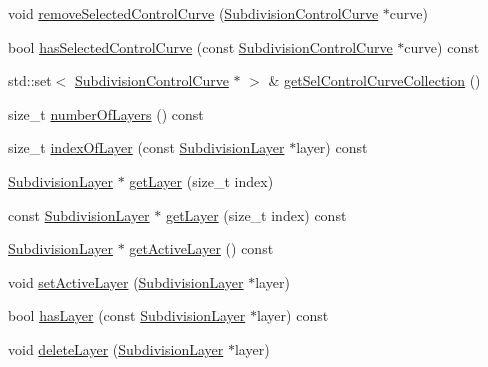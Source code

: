 \begin{DoxyCompactItemize}
\item 
void \hyperlink{classShipCAD_1_1SubdivisionSurface_a1666628c8232ba11d386641fa7980ed7}{remove\+Selected\+Control\+Curve} (\hyperlink{classShipCAD_1_1SubdivisionControlCurve}{Subdivision\+Control\+Curve} $\ast$curve)
\item 
bool \hyperlink{classShipCAD_1_1SubdivisionSurface_a1eebd6470c583678d5994007be6b4a9b}{has\+Selected\+Control\+Curve} (const \hyperlink{classShipCAD_1_1SubdivisionControlCurve}{Subdivision\+Control\+Curve} $\ast$curve) const 
\item 
std\+::set$<$ \hyperlink{classShipCAD_1_1SubdivisionControlCurve}{Subdivision\+Control\+Curve} $\ast$ $>$ \& \hyperlink{classShipCAD_1_1SubdivisionSurface_a8a5a47a51d20fd5ceaf2643e245331a2}{get\+Sel\+Control\+Curve\+Collection} ()
\item 
size\+\_\+t \hyperlink{classShipCAD_1_1SubdivisionSurface_a011480014cfb68430c9f60aff474936c}{number\+Of\+Layers} () const 
\item 
size\+\_\+t \hyperlink{classShipCAD_1_1SubdivisionSurface_a9d2f9e794d6c320f9603daa399e214d5}{index\+Of\+Layer} (const \hyperlink{classShipCAD_1_1SubdivisionLayer}{Subdivision\+Layer} $\ast$layer) const 
\item 
\hyperlink{classShipCAD_1_1SubdivisionLayer}{Subdivision\+Layer} $\ast$ \hyperlink{classShipCAD_1_1SubdivisionSurface_a24b230e51a0c5fb3e7f51d0e2340eb9f}{get\+Layer} (size\+\_\+t index)
\item 
const \hyperlink{classShipCAD_1_1SubdivisionLayer}{Subdivision\+Layer} $\ast$ \hyperlink{classShipCAD_1_1SubdivisionSurface_a4a88deb6d846d7ba2d4a147ed5f7b5bc}{get\+Layer} (size\+\_\+t index) const 
\item 
\hyperlink{classShipCAD_1_1SubdivisionLayer}{Subdivision\+Layer} $\ast$ \hyperlink{classShipCAD_1_1SubdivisionSurface_a5f2fbd88c0652692848f71945c6e34b8}{get\+Active\+Layer} () const 
\item 
void \hyperlink{classShipCAD_1_1SubdivisionSurface_a69bafa71111e562a52a089be99b47871}{set\+Active\+Layer} (\hyperlink{classShipCAD_1_1SubdivisionLayer}{Subdivision\+Layer} $\ast$layer)
\item 
bool \hyperlink{classShipCAD_1_1SubdivisionSurface_afca8f2be85e020c226d615f093a54aa8}{has\+Layer} (const \hyperlink{classShipCAD_1_1SubdivisionLayer}{Subdivision\+Layer} $\ast$layer) const 
\item 
void \hyperlink{classShipCAD_1_1SubdivisionSurface_a3f0dac49106056562a8b675c61918abe}{delete\+Layer} (\hyperlink{classShipCAD_1_1SubdivisionLayer}{Subdivision\+Layer} $\ast$layer)

\end{DoxyCompactItemize}
